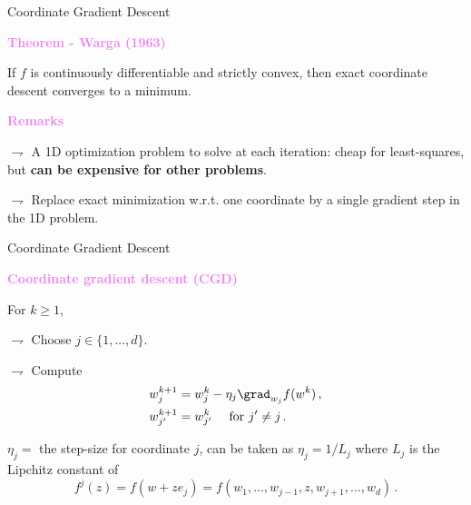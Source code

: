 \documentclass[xcolor={usenames,dvipsnames}]{beamer}
\begin{document}
\begin{frame}{Coordinate Gradient Descent}

\textbf{\textcolor{violet}{Theorem - Warga (1963)}}

If $f$ is \alert{continuously differentiable and strictly convex}, then exact coordinate descent \alert{converges to a minimum}.


\bigskip

\textbf{\textcolor{violet}{Remarks}}


$\rightharpoondown$ A 1D optimization problem to solve at each iteration: cheap for least-squares, but \textbf{can be expensive for other problems}.

$\rightharpoondown$ Replace exact minimization w.r.t. one coordinate by \alert{a single gradient step in the 1D problem}.

\end{frame}


\begin{frame}{Coordinate Gradient Descent}
			
\textbf{\textcolor{violet}{Coordinate gradient descent (CGD)}}

 For $k\geqslant 1$,

$\rightharpoondown$  Choose $j \in \{ 1, \ldots, d \}$.

$\rightharpoondown$  Compute
\begin{align*}
w_{j}^{k+1} &= w_{j}^{k} - \eta_{j} \grad_{w_j} f(w^k)\,, \\
w_{j'}^{k+1} &= w_{j'}^{k} \quad \text{ for } j' \neq j\,.
\end{align*}


\bigskip

\alert{$\eta_j=$ the step-size for coordinate $j$, can be taken as $\eta_j= 1 / L_j$} where $L_j$ is the Lipchitz constant of
\begin{equation*}
f^j(z) = f(w + z e_j) = f(w_1, \ldots, w_{j-1}, z, w_{j+1}, \ldots, w_d)\,.
\end{equation*}



\end{frame}
\end{document}
